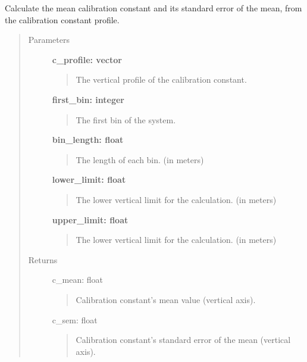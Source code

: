 \documentclass[letterpaper,10pt,english]{sphinxmanual}
\begin{document}
\begin{fulllineitems}
\label{depolarization:depolarization.calibration_constant_value}
Calculate the mean calibration constant and its standard error of the mean,
from the calibration constant profile.
\begin{quote}\begin{description}
\item[{Parameters}] \leavevmode
\textbf{c\_profile: vector}
\begin{quote}

The vertical profile of the calibration constant.
\end{quote}

\textbf{first\_bin: integer}
\begin{quote}

The first bin of the system.
\end{quote}

\textbf{bin\_length: float}
\begin{quote}

The length of each bin. (in meters)
\end{quote}

\textbf{lower\_limit: float}
\begin{quote}

The lower vertical limit for the calculation. (in meters)
\end{quote}

\textbf{upper\_limit: float}
\begin{quote}

The lower vertical limit for the calculation. (in meters)
\end{quote}

\item[{Returns}] \leavevmode
c\_mean: float
\begin{quote}

Calibration constant's mean value (vertical axis).
\end{quote}

c\_sem: float
\begin{quote}

Calibration constant's standard error of the mean (vertical axis).
\end{quote}

\end{description}\end{quote}

\end{fulllineitems}
\end{document}
